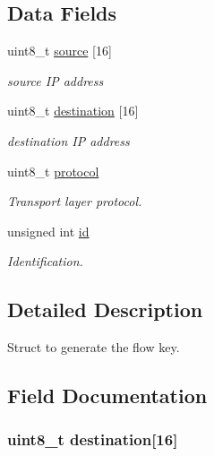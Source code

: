 \subsection*{Data Fields}
\begin{DoxyCompactItemize}
\item 
uint8\-\_\-t \hyperlink{structntoh__ipv6__tuple4__t_a6c2f6f541fb52e9338bada1c236125c1}{source} \mbox{[}16\mbox{]}
\begin{DoxyCompactList}\small\item\em source I\-P address \end{DoxyCompactList}\item 
uint8\-\_\-t \hyperlink{structntoh__ipv6__tuple4__t_a20dc0b5a2abfcfa11414f5c7f9f19111}{destination} \mbox{[}16\mbox{]}
\begin{DoxyCompactList}\small\item\em destination I\-P address \end{DoxyCompactList}\item 
uint8\-\_\-t \hyperlink{structntoh__ipv6__tuple4__t_ad124d3d2e02c729afa303c775295278e}{protocol}
\begin{DoxyCompactList}\small\item\em Transport layer protocol. \end{DoxyCompactList}\item 
unsigned int \hyperlink{structntoh__ipv6__tuple4__t_ab7ce6f462afaf105224b0ca772a33c43}{id}
\begin{DoxyCompactList}\small\item\em Identification. \end{DoxyCompactList}\end{DoxyCompactItemize}


\subsection{Detailed Description}
Struct to generate the flow key. 

\subsection{Field Documentation}
\hypertarget{structntoh__ipv6__tuple4__t_a20dc0b5a2abfcfa11414f5c7f9f19111}{
\subsubsection[{destination}]{\setlength{\rightskip}{0pt plus 5cm}uint8\-\_\-t destination\mbox{[}16\mbox{]}}}\label{structntoh__ipv6__tuple4__t_a20dc0b5a2abfcfa11414f5c7f9f19111}



